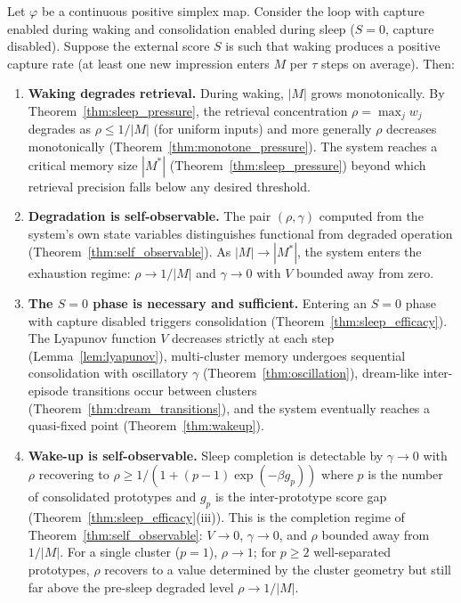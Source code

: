 \begin{corollary}
\label{cor:forced_cycle}
\leanok
{}
Let $\varphi$ be a continuous positive simplex map.  Consider the loop
with capture enabled during waking and consolidation enabled during sleep
($S = 0$, capture disabled).  Suppose the external score $S$ is such that
waking produces a positive capture rate (at least one new impression enters
$M$ per $\tau$ steps on average).  Then:

\begin{enumerate}
\item \textbf{Waking degrades retrieval.}  During waking, $|M|$ grows
monotonically.  By Theorem~\ref{thm:sleep_pressure}, the retrieval
concentration $\rho = \max_j w_j$ degrades as $\rho \leq 1/|M|$ (for
uniform inputs) and more generally $\rho$ decreases monotonically
(Theorem~\ref{thm:monotone_pressure}).  The system reaches a critical
memory size $|M^*|$ (Theorem~\ref{thm:sleep_pressure}) beyond which
retrieval precision falls below any desired threshold.

\item \textbf{Degradation is self-observable.}  The pair
$(\rho, \gamma)$ computed from the system's own state variables
distinguishes functional from degraded operation
(Theorem~\ref{thm:self_observable}).  As $|M| \to |M^*|$, the system
enters the exhaustion regime: $\rho \to 1/|M|$ and $\gamma \to 0$ with
$V$ bounded away from zero.

\item \textbf{The $S = 0$ phase is necessary and sufficient.}  Entering an $S = 0$
phase with capture disabled triggers consolidation
(Theorem~\ref{thm:sleep_efficacy}).  The Lyapunov function $V$ decreases
strictly at each step (Lemma~\ref{lem:lyapunov}),
multi-cluster memory undergoes sequential consolidation with oscillatory
$\gamma$ (Theorem~\ref{thm:oscillation}), dream-like inter-episode
transitions occur between clusters
(Theorem~\ref{thm:dream_transitions}), and the system eventually reaches
a quasi-fixed point (Theorem~\ref{thm:wakeup}).

\item \textbf{Wake-up is self-observable.}  Sleep completion is
detectable by $\gamma \to 0$ with $\rho$ recovering to
$\rho \geq 1/(1 + (p-1)\exp(-\beta g_p))$ where $p$ is the number of
consolidated prototypes and $g_p$ is the inter-prototype score gap
(Theorem~\ref{thm:sleep_efficacy}(iii)).  This is the completion regime
of Theorem~\ref{thm:self_observable}: $V \to 0$, $\gamma \to 0$,
and $\rho$ bounded away from $1/|M|$.  For a single cluster ($p = 1$),
$\rho \to 1$; for $p \geq 2$ well-separated prototypes, $\rho$ recovers
to a value determined by the cluster geometry but still far above the
pre-sleep degraded level $\rho \to 1/|M|$.


\end{enumerate}
\end{corollary}
